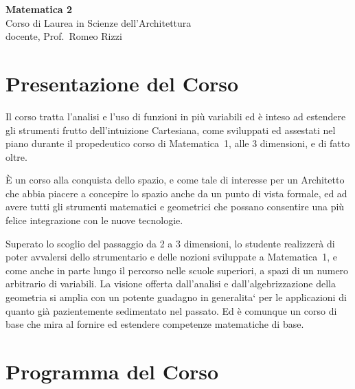 \documentclass{article}
\begin{document}
\begin{center}
{\large
{\LARGE \bf \sc Matematica 2\\}
\vspace{2mm}
Corso di Laurea in Scienze dell'Architettura\\
\vspace{5mm}
docente, Prof.~Romeo Rizzi}
\end{center}

\section*{Presentazione del Corso}

   Il corso tratta l'analisi
   e l'uso di funzioni in pi\`u variabili
   ed \`e inteso ad estendere
   gli strumenti frutto dell'intuizione Cartesiana,
   come sviluppati ed assestati nel piano durante
   il propedeutico corso di Matematica~1,
   alle 3 dimensioni, e di fatto oltre.

   \`E un corso alla conquista dello spazio,
   e come tale di interesse per un Architetto
   che abbia piacere a concepire lo spazio
   anche da un punto di vista formale, ed ad avere tutti
   gli strumenti matematici e geometrici
   che possano consentire una pi\`u felice
   integrazione con le nuove tecnologie.

   Superato lo scoglio del passaggio da 2 a 3 dimensioni,
   lo studente realizzer\`a di poter avvalersi dello
   strumentario e delle nozioni sviluppate a Matematica~1,
   e come anche in parte lungo il percorso nelle scuole superiori,
   a spazi di un numero arbitrario di variabili.
   La visione offerta dall'analisi e dall'algebrizzazione della geometria
   si amplia con un potente guadagno in generalita`
   per le applicazioni di quanto gi\`a pazientemente sedimentato nel passato.
   Ed \`e comunque un corso di base che mira al fornire ed estendere
   competenze matematiche di base.

\section*{Programma del Corso}
\end{document}
